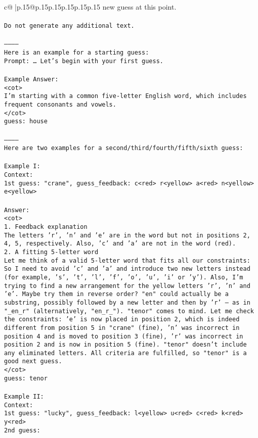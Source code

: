\documentclass{article}
\begin{document}
{\begin{supertabular}{c@{$\;$}|p{.15\linewidth}@{}p{.15\linewidth}p{.15\linewidth}p{.15\linewidth}p{.15\linewidth}p{.15\linewidth}}
{{{new guess at this point.\\ \tt \\ \tt Do not generate any additional text.\\ \tt \\ \tt -----------\\ \tt Here is an example for a starting guess:\\ \tt Prompt: … Let's begin with your first guess.\\ \tt \\ \tt Example Answer:\\ \tt <cot>\\ \tt I'm starting with a common five-letter English word, which includes frequent consonants and vowels.\\ \tt </cot>\\ \tt guess: house\\ \tt \\ \tt -----------\\ \tt Here are two examples for a second/third/fourth/fifth/sixth guess:\\ \tt \\ \tt Example I:\\ \tt Context:\\ \tt 1st guess: "crane", guess_feedback: c<red> r<yellow> a<red> n<yellow> e<yellow>\\ \tt \\ \tt Answer:\\ \tt <cot>\\ \tt 1. Feedback explanation\\ \tt The letters 'r', 'n' and 'e' are in the word but not in positions 2, 4, 5, respectively. Also, 'c' and 'a' are not in the word (red).\\ \tt 2. A fitting 5-letter word\\ \tt Let me think of a valid 5-letter word that fits all our constraints: So I need to avoid 'c' and 'a' and introduce two new letters instead (for example, 's', 't', 'l', 'f', 'o', 'u', 'i' or 'y'). Also, I'm trying to find a new arrangement for the yellow letters 'r', 'n' and 'e'. Maybe try them in reverse order? "en" could actually be a substring, possibly followed by a new letter and then by 'r' — as in "_en_r" (alternatively, "en_r_"). "tenor" comes to mind. Let me check the constraints: 'e' is now placed in position 2, which is indeed different from position 5 in "crane" (fine), 'n' was incorrect in position 4 and is moved to position 3 (fine), 'r' was incorrect in position 2 and is now in position 5 (fine). "tenor" doesn't include any eliminated letters. All criteria are fulfilled, so "tenor" is a good next guess.\\ \tt </cot>\\ \tt guess: tenor\\ \tt \\ \tt Example II:\\ \tt Context:\\ \tt 1st guess: "lucky", guess_feedback: l<yellow> u<red> c<red> k<red> y<red>\\ \tt 2nd guess: }}}
\end{supertabular}}
\end{document}
